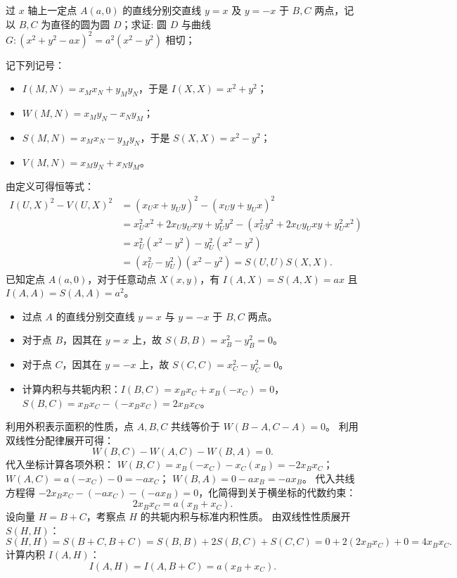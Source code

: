 \begin{example}
过 $x$ 轴上一定点 $A(a,0)$ 的直线分别交直线 $y=x$ 及 $y=-x$ 于 $B,C$ 两点，记以 $B,C$ 为直径的圆为圆 $D$；求证: 圆 $D$ 与曲线 $G: (x^2 + y^2 - ax)^2 = a^2(x^2 - y^2)$ 相切；
\end{example}
\begin{solution}
记下列记号：
\begin{itemize}
    \item $I(M,N) = x_M x_N + y_M y_N$，于是 $I(X,X) = x^2 + y^2$；
    \item $W(M,N) = x_M y_N - x_N y_M$；
    \item $S(M,N) = x_M x_N - y_M y_N$，于是 $S(X,X) = x^2 - y^2$；
    \item $V(M,N) = x_M y_N + x_N y_M$。
\end{itemize}
由定义可得恒等式：
\begin{align*}
I(U,X)^2 - V(U,X)^2 &= (x_U x + y_U y)^2 - (x_U y + y_U x)^2 \\
&= x_U^2 x^2 + 2x_U y_U xy + y_U^2 y^2 - (x_U^2 y^2 + 2x_U y_U xy + y_U^2 x^2) \\
&= x_U^2(x^2 - y^2) - y_U^2(x^2 - y^2) \\
&= (x_U^2 - y_U^2)(x^2 - y^2) = S(U,U) S(X,X).
\end{align*}
已知定点 $A(a,0)$，对于任意动点 $X(x,y)$，有 $I(A,X) = S(A,X) = ax$ 且 $I(A,A) = S(A,A) = a^2$。
\begin{itemize}
\item 过点 $A$ 的直线分别交直线 $y=x$ 与 $y=-x$ 于 $B, C$ 两点。
\item 对于点 $B$，因其在 $y=x$ 上，故 $S(B,B) = x_B^2 - y_B^2 = 0$。
\item 对于点 $C$，因其在 $y=-x$ 上，故 $S(C,C) = x_C^2 - y_C^2 = 0$。
\item 计算内积与共轭内积：$I(B,C) = x_B x_C + x_B(-x_C) = 0$，$S(B,C) = x_B x_C - (-x_B x_C) = 2x_B x_C$。
\end{itemize}
利用外积表示面积的性质，点 $A,B,C$ 共线等价于 $W(B-A, C-A) = 0$。
利用双线性分配律展开可得：
\[
W(B,C) - W(A,C) - W(B,A) = 0.
\]
代入坐标计算各项外积：
$W(B,C) = x_B(-x_C) - x_C(x_B) = -2x_B x_C$；
$W(A,C) = a(-x_C) - 0 = -a x_C$；
$W(B,A) = 0 - a x_B = -a x_B$。
代入共线方程得 $-2x_B x_C - (-a x_C) - (-a x_B) = 0$，化简得到关于横坐标的代数约束：
\[
2x_B x_C = a(x_B + x_C).
\]
设向量 $H = B+C$，考察点 $H$ 的共轭内积与标准内积性质。
由双线性性质展开 $S(H,H)$：
\[
S(H,H) = S(B+C, B+C) = S(B,B) + 2S(B,C) + S(C,C) = 0 + 2(2x_B x_C) + 0 = 4x_B x_C.
\]
计算内积 $I(A,H)$：
\[
I(A,H) = I(A, B+C) = a(x_B + x_C).
\]
\end{solution}
